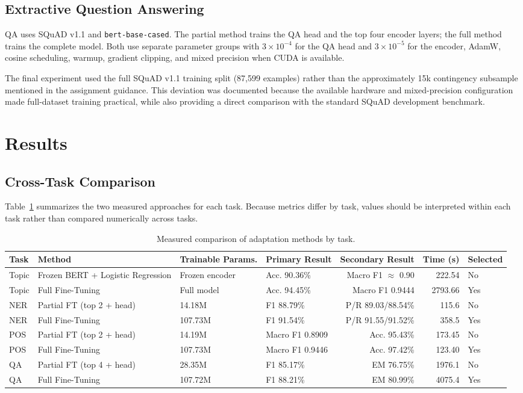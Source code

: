 \documentclass[conference]{IEEEtran}
\begin{document}
\subsection{Extractive Question Answering}
QA uses SQuAD v1.1 \cite{rajpurkar2016squad} and \texttt{bert-base-cased}. The partial method trains the QA head and the top four encoder layers; the full method trains the complete model. Both use separate parameter groups with $3\times10^{-4}$ for the QA head and $3\times10^{-5}$ for the encoder, AdamW, cosine scheduling, warmup, gradient clipping, and mixed precision when CUDA is available.

The final experiment used the full SQuAD v1.1 training split (87,599 examples) rather than the approximately 15k contingency subsample mentioned in the assignment guidance. This deviation was documented because the available hardware and mixed-precision configuration made full-dataset training practical, while also providing a direct comparison with the standard SQuAD development benchmark.

\section{Results}

\subsection{Cross-Task Comparison}
Table~\ref{tab:mainresults} summarizes the two measured approaches for each task. Because metrics differ by task, values should be interpreted within each task rather than compared numerically across tasks.

\begin{table}[t]
\centering
\caption{Measured comparison of adaptation methods by task.}
\label{tab:mainresults}
\small
\begin{tabular}{@{}llllrrl@{}}
\toprule
Task & Method & Trainable Params. & Primary Result & Secondary Result & Time (s) & Selected \\
\midrule
Topic & Frozen BERT + Logistic Regression & Frozen encoder & Acc. 90.36\% & Macro F1 $\approx$ 0.90 & 222.54 & No \\
Topic & Full Fine-Tuning & Full model & Acc. 94.45\% & Macro F1 0.9444 & 2793.66 & Yes \\
NER & Partial FT (top 2 + head) & 14.18M & F1 88.79\% & P/R 89.03/88.54\% & 115.6 & No \\
NER & Full Fine-Tuning & 107.73M & F1 91.54\% & P/R 91.55/91.52\% & 358.5 & Yes \\
POS & Partial FT (top 2 + head) & 14.19M & Macro F1 0.8909 & Acc. 95.43\% & 173.45 & No \\
POS & Full Fine-Tuning & 107.73M & Macro F1 0.9446 & Acc. 97.42\% & 123.40 & Yes \\
QA & Partial FT (top 4 + head) & 28.35M & F1 85.17\% & EM 76.75\% & 1976.1 & No \\
QA & Full Fine-Tuning & 107.72M & F1 88.21\% & EM 80.99\% & 4075.4 & Yes \\
\bottomrule
\end{tabular}
\end{table}
\end{document}
